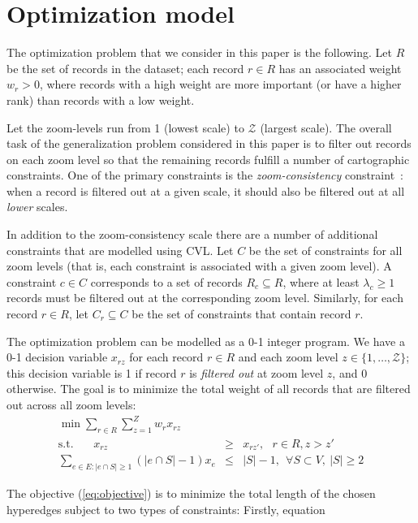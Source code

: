 \section{Optimization model}
\label{sec:optimizationmodel}

The optimization problem that we consider in this paper is the following. Let $R$ be the set of records in the dataset; each record $r \in R$ has an associated weight $w_r > 0$, where records with a high weight are more important (or have a higher rank) than records with a low weight. 

Let the zoom-levels run from 1 (lowest scale) to $\mathcal{Z}$ (largest scale). The overall task of the generalization problem considered in this paper is to filter out records on each zoom level so that the remaining records fulfill a number of cartographic constraints. One of the primary constraints is the \emph{zoom-consistency} constraint~\cite{fusiontables}: when a record is filtered out at a given scale, it should also be filtered out at all \emph{lower} scales. 

In addition to the zoom-consistency scale there are a number of additional constraints that are modelled using CVL. Let $C$ be the set of constraints for all zoom levels (that is, each constraint is associated with a given zoom level). A constraint $c \in C$ corresponds to a set of records $R_c \subseteq R$, where at least $\lambda_c \geq 1$ records must be filtered out at the corresponding zoom level. Similarly, for each record $r \in R$, let $C_r \subseteq C$ be the set of constraints that contain record $r$.

The optimization problem can be modelled as a 0-1 integer program. We have a 0-1 decision variable $x_{rz}$ for each record $r \in R$ and each zoom level $z \in \{1,\ldots, \mathcal{Z}\}$; this decision variable is 1 if record $r$ is \emph{filtered out} at zoom level $z$, and 0 otherwise. The goal is to minimize the total weight of all records that are filtered out across all zoom levels:
\begin{eqnarray}
  \label{eq:objective}
  \mbox{$\min \sum_{r \in R} \sum_{z=1}^Z w_r x_{rz}$}  & & \\
  \label{eq:zoom-consistency}
  \mbox{s.t.}~~~~~~~~x_{rz} & \geq & x_{rz'}, ~~~r \in R, z > z' \\
  \label{eq:secs}
  \sum_{e \in E: |e \cap S| \geq 1}
                 (|e \cap S|-1) x_e & \leq & |S| - 1,~~
  \forall S \subset V, ~|S| \geq 2
\end{eqnarray}

The objective (\ref{eq:objective}) is to minimize the total length of the chosen hyperedges subject to two types of constraints: Firstly, equation


  

